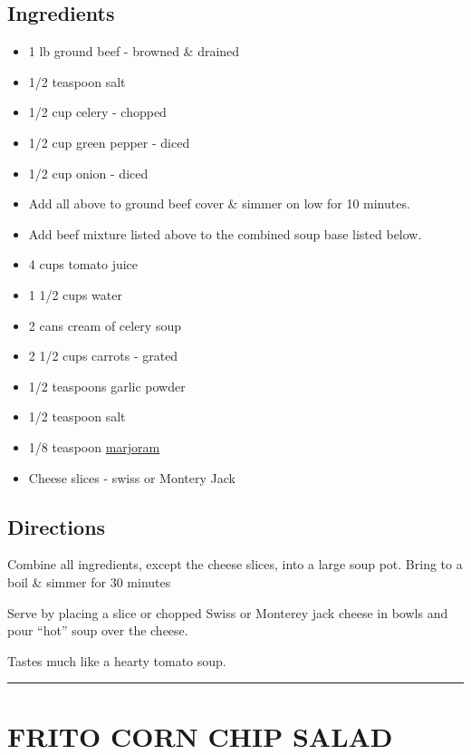 \documentclass[
]{book}
\providecommand{\tightlist}{%
  \setlength{\itemsep}{0pt}\setlength{\parskip}{0pt}}
\begin{document}
\hypertarget{ingredients-17}{%
\subsection*{Ingredients}\label{ingredients-17}}


\begin{itemize}
\tightlist
\item
  1 lb ground beef - browned \& drained
\item
  1/2 teaspoon salt
\item
  1/2 cup celery - chopped
\item
  1/2 cup green pepper - diced
\item
  1/2 cup onion - diced
\item
  Add all above to ground beef cover \& simmer on low for 10 minutes.
\item
  Add beef mixture listed above to the combined soup base listed below.
\item
  4 cups tomato juice
\item
  1 1/2 cups water
\item
  2 cans cream of celery soup
\item
  2 1/2 cups carrots - grated
\item
  1/2 teaspoons garlic powder
\item
  1/2 teaspoon salt
\item
  1/8 teaspoon \href{https://en.wikipedia.org/wiki/Marjoram}{marjoram}
\item
  Cheese slices - swiss or Montery Jack
\end{itemize}

\hypertarget{directions-17}{%
\subsection*{Directions}\label{directions-17}}


Combine all ingredients, except the cheese slices, into a large soup pot. Bring to a boil \& simmer for 30 minutes

Serve by placing a slice or chopped Swiss or Monterey jack cheese in bowls and pour ``hot'' soup over the cheese.

Tastes much like a hearty tomato soup.

\begin{center}\rule{0.5\linewidth}{0.5pt}\end{center}

\hypertarget{frito-corn-chip-salad}{%
\section*{FRITO CORN CHIP SALAD}\label{frito-corn-chip-salad}}
\end{document}
